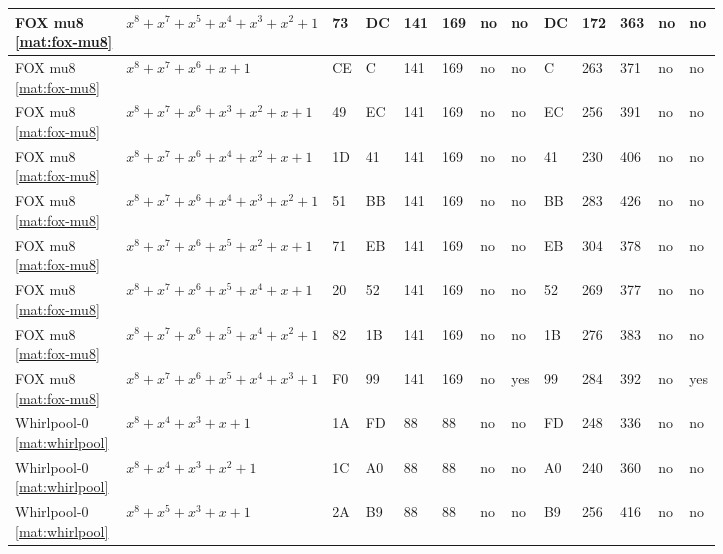 \begin{tiny}
\begin{longtable}{|l|l|l|l|l|l|l|l|l|l|l|l|l|}
\shortstack{FOX mu8 \\ \eqref{mat:fox-mu8}} & $x^8 + x^7 + x^5 + x^4 + x^3 + x^2 + 1$ & 73 & DC & 141 & 169 & no & no & DC & 172 & 363 & no & no \\ \hline
\shortstack{FOX mu8 \\ \eqref{mat:fox-mu8}} & $x^8 + x^7 + x^6 + x + 1$ & CE & C & 141 & 169 & no & no & C & 263 & 371 & no & no \\ \hline
\shortstack{FOX mu8 \\ \eqref{mat:fox-mu8}} & $x^8 + x^7 + x^6 + x^3 + x^2 + x + 1$ & 49 & EC & 141 & 169 & no & no & EC & 256 & 391 & no & no \\ \hline
\shortstack{FOX mu8 \\ \eqref{mat:fox-mu8}} & $x^8 + x^7 + x^6 + x^4 + x^2 + x + 1$ & 1D & 41 & 141 & 169 & no & no & 41 & 230 & 406 & no & no \\ \hline
\shortstack{FOX mu8 \\ \eqref{mat:fox-mu8}} & $x^8 + x^7 + x^6 + x^4 + x^3 + x^2 + 1$ & 51 & BB & 141 & 169 & no & no & BB & 283 & 426 & no & no \\ \hline
\shortstack{FOX mu8 \\ \eqref{mat:fox-mu8}} & $x^8 + x^7 + x^6 + x^5 + x^2 + x + 1$ & 71 & EB & 141 & 169 & no & no & EB & 304 & 378 & no & no \\ \hline
\shortstack{FOX mu8 \\ \eqref{mat:fox-mu8}} & $x^8 + x^7 + x^6 + x^5 + x^4 + x + 1$ & 20 & 52 & 141 & 169 & no & no & 52 & 269 & 377 & no & no \\ \hline
\shortstack{FOX mu8 \\ \eqref{mat:fox-mu8}} & $x^8 + x^7 + x^6 + x^5 + x^4 + x^2 + 1$ & 82 & 1B & 141 & 169 & no & no & 1B & 276 & 383 & no & no \\ \hline
\shortstack{FOX mu8 \\ \eqref{mat:fox-mu8}} & $x^8 + x^7 + x^6 + x^5 + x^4 + x^3 + 1$ & F0 & 99 & 141 & 169 & no & yes & 99 & 284 & 392 & no & yes \\ \hline
\shortstack{Whirlpool-0 \\ \eqref{mat:whirlpool}} & $x^8 + x^4 + x^3 + x + 1$ & 1A & FD & 88 & 88 & no & no & FD & 248 & 336 & no & no \\ \hline
\shortstack{Whirlpool-0 \\ \eqref{mat:whirlpool}} & $x^8 + x^4 + x^3 + x^2 + 1$ & 1C & A0 & 88 & 88 & no & no & A0 & 240 & 360 & no & no \\ \hline
\shortstack{Whirlpool-0 \\ \eqref{mat:whirlpool}} & $x^8 + x^5 + x^3 + x + 1$ & 2A & B9 & 88 & 88 & no & no & B9 & 256 & 416 & no & no \\ \hline

\end{longtable}
\end{tiny}
